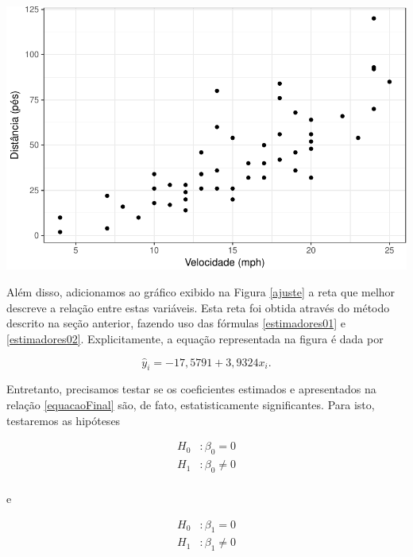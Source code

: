 \documentclass[12pt,twoside,printwatermark=false]{pinp}
\begin{document}
\begin{center}\includegraphics{Untitled_files/figure-latex/graficoDispersao-1} \end{center}

Além disso, adicionamos ao gráfico exibido na Figura \ref{ajuste} a reta
que melhor descreve a relação entre estas variáveis. Esta reta foi
obtida através do método descrito na seção anterior, fazendo uso das
fórmulas \eqref{estimadores01} e \eqref{estimadores02}. Explicitamente,
a equação representada na figura é dada por

\begin{Shaded}
\begin{Highlighting}[]
\StringTok{ }\OperatorTok{~}\StringTok{ }
\end{Highlighting}
\end{Shaded}

\begin{equation}\label{equacaoFinal}
\widehat{y}_i = -17,5791 + 3,9324x_i.
\end{equation}

Entretanto, precisamos testar se os coeficientes estimados e
apresentados na relação \eqref{equacaoFinal} são, de fato,
estatisticamente significantes. Para isto, testaremos as hipóteses

\begin{align*}
H_0 &: \beta_0 = 0 \\
H_1 &: \beta_0 \neq 0 \\
\end{align*}

\noindent e

\begin{align*}
H_0 &: \beta_1 = 0 \\
H_1 &: \beta_1 \neq 0 \\
\end{align*}
\end{document}
